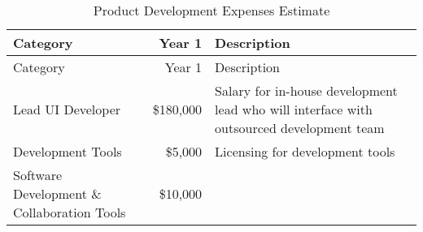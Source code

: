 \documentclass[10pt,openany]{book}
\begin{document}
\begin{longtable}[]{@{}lrl@{}}
\caption{Product Development Expenses Estimate}\tabularnewline
\toprule
\begin{minipage}[b]{0.41\columnwidth}\raggedright
Category\strut
\end{minipage} & \begin{minipage}[b]{0.11\columnwidth}\raggedleft
Year 1\strut
\end{minipage} & \begin{minipage}[b]{0.39\columnwidth}\raggedright
Description\strut
\end{minipage}\tabularnewline
\midrule
\endfirsthead
\toprule
\begin{minipage}[b]{0.41\columnwidth}\raggedright
Category\strut
\end{minipage} & \begin{minipage}[b]{0.11\columnwidth}\raggedleft
Year 1\strut
\end{minipage} & \begin{minipage}[b]{0.39\columnwidth}\raggedright
Description\strut
\end{minipage}\tabularnewline
\midrule
\endhead
\begin{minipage}[t]{0.41\columnwidth}\raggedright
Lead UI Developer\strut
\end{minipage} & \begin{minipage}[t]{0.11\columnwidth}\raggedleft
\$180,000\strut
\end{minipage} & \begin{minipage}[t]{0.39\columnwidth}\raggedright
Salary for in-house development lead who will interface with outsourced
development team\strut
\end{minipage}\tabularnewline
\begin{minipage}[t]{0.41\columnwidth}\raggedright
Development Tools\strut
\end{minipage} & \begin{minipage}[t]{0.11\columnwidth}\raggedleft
\$5,000\strut
\end{minipage} & \begin{minipage}[t]{0.39\columnwidth}\raggedright
Licensing for development tools\strut
\end{minipage}\tabularnewline
\begin{minipage}[t]{0.41\columnwidth}\raggedright
Software Development \& Collaboration Tools\strut
\end{minipage} & \begin{minipage}[t]{0.11\columnwidth}\raggedleft
\$10,000\strut

\end{minipage}
\end{longtable}
\end{document}

